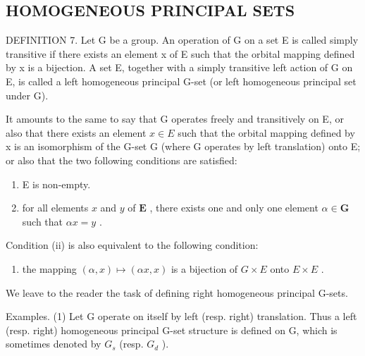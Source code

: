\subsection{HOMOGENEOUS PRINCIPAL SETS}

DEFINITION 7. Let G be a group. An operation of G on a set E is called simply transitive if there exists an element x of E such that the orbital mapping defined by x is a bijection. A set E, together with a simply transitive left action of G on E, is called a left homogeneous principal G-set (or left homogeneous principal set under G).

It amounts to the same to say that G operates freely and transitively on E, or also that there exists an element \(x \in E\) such that the orbital mapping defined by x is an isomorphism of the G-set G (where G operates by left translation) onto E; or also that the two following conditions are satisfied:

\begin{enumerate}
\def\labelenumi{(\roman{enumi})}
\item
  E is non-empty.
\item
  for all elements \(x\) and \(y\) of \(\mathbf{E}\) , there exists one and only one element \(\alpha \in \mathbf{G}\) such that \(\alpha x = y\) .
\end{enumerate}

Condition (ii) is also equivalent to the following condition:

\begin{enumerate}
\def\labelenumi{(\roman{enumi})}
\setcounter{enumi}{2}
\tightlist
\item
  the mapping \((\alpha, x) \mapsto (\alpha x, x)\) is a bijection of \(G \times E\) onto \(E \times E\) .
\end{enumerate}

We leave to the reader the task of defining right homogeneous principal G-sets.

Examples. (1) Let G operate on itself by left (resp. right) translation. Thus a left (resp. right) homogeneous principal G-set structure is defined on G, which is sometimes denoted by \(G_{s}\) (resp. \(G_{d}\) ).

